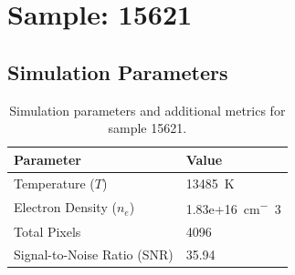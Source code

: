\documentclass[a4paper,11pt]{article}
\begin{document}
\clearpage

\section{Sample: 15621}
\subsection{Simulation Parameters}
\begin{table}[h!]
    \centering
    \begin{tabular}{ll}
        \toprule
        \textbf{Parameter} & \textbf{Value} \\
        \midrule
        Temperature ($T$) & 13485 \,\si{K} \\
        Electron Density ($n_e$) & 1.83e+16 \,\si{cm^-3} \\
        Total Pixels & 4096 \\
        Signal-to-Noise Ratio (SNR) & 35.94 \\
        \bottomrule
    \end{tabular}
    \caption{Simulation parameters and additional metrics for sample 15621.}
    \label{tab:params_15621}
\end{table}
\end{document}
